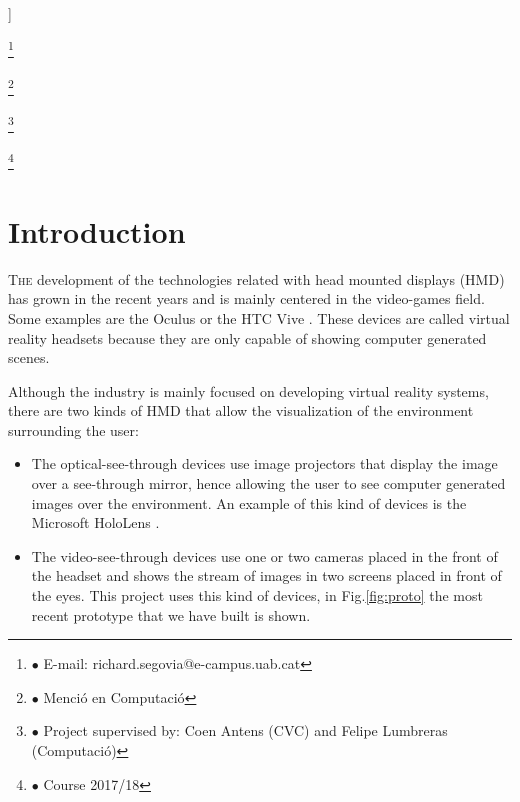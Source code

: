 \documentclass[10pt,a4paper,twocolumn,twoside]{article}
\newcommand\blfootnote[1]{%
  \begingroup
  \renewcommand\thefootnote{}\footnote{#1}%
  \addtocounter{footnote}{-1}%
  \endgroup
}
\begin{document}
\begin{@twocolumnfalse}
\begin{center}
	\bigskip
	
	{\vrule depth 0pt height 0.5pt width 4cm\hspace{7.5pt}%
	\hspace{7.5pt}\vrule depth 0pt height 0.5pt width 4cm\relax}
	
	\end{center}
	
	\bigskip
	\end{@twocolumnfalse}]
	
	\blfootnote{$\bullet$ E-mail: richard.segovia@e-campus.uab.cat}
	\blfootnote{$\bullet$ Menció en Computació}
	\blfootnote{$\bullet$ Project supervised by: Coen Antens (CVC) and Felipe Lumbreras (Computació)}
	\blfootnote{$\bullet$ Course 2017/18}
	
	\section{Introduction}
	
	\lettrine[lines=3]{T}{he} development of the technologies related with head mounted displays (HMD) has grown in the recent years and is mainly centered in the video-games field. Some examples are the Oculus \cite{web:oculus} or the HTC Vive \cite{web:vive}. These devices are called virtual reality headsets because they are only capable of showing computer generated scenes.  
	
	Although the industry is mainly focused on developing virtual reality systems, there are two kinds of HMD that allow the visualization of the environment surrounding the user:  

	\begin{itemize}
		\item The optical-see-through devices use image projectors that display the image over a see-through mirror, hence allowing the user to see computer generated images over the environment. An example of this kind of devices is the Microsoft HoloLens \cite{web:hololens}.
		
		\item The video-see-through devices use one or two cameras placed in the front of the headset and shows the stream of images in two screens placed in front of the eyes. This project uses this kind of devices, in Fig.\ref{fig:proto} the most recent prototype that we have built is shown. 
	\end{itemize}
\end{document}
